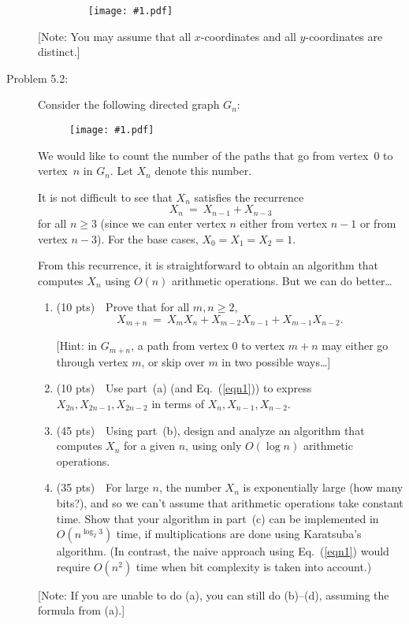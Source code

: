 \documentclass[11pt]{article}
\newcommand{\fig}[2]{\begin{figure}[h]\begin{center}%
  \texttt{[image: \#1.pdf]}\end{center}%
  \end{figure}}
\begin{document}
\begin{description}
\begin{enumerate}
\fig{hw5fig}{0.5,page=3}
\end{enumerate}

[Note: You may assume that all $x$-coordinates and all $y$-coordinates are distinct.]


\bigskip
\item[Problem 5.2:]
Consider the following directed graph $G_n$:

\fig{hw5fig2}{0.7}

We would like to count the number of the paths that go from vertex~$0$ to vertex~$n$ in $G_n$.  Let $X_n$ denote this number.

It is not difficult to see that $X_n$ satisfies the
recurrence 
\begin{equation}\label{eqn1}
X_n\:=\: X_{n-1}+X_{n-3}
\end{equation}
for all $n\ge 3$ (since we can enter vertex $n$ either from vertex $n-1$ or from vertex $n-3$).  For the base cases, $X_0=X_1=X_2=1$.

From this recurrence, it is straightforward to obtain an algorithm that computes $X_n$ using $O(n)$ arithmetic operations.  But we can do better\ldots

\begin{enumerate}
\item[(a)] (10 pts)\ \
Prove that for all $m,n\ge 2$,
\[ X_{m+n} \:=\: X_m X_n + X_{m-2} X_{n-1} + X_{m-1} X_{n-2}. \]

[Hint: in $G_{m+n}$, a path from vertex 0 to vertex $m+n$ may either go through vertex $m$,
or skip over $m$ in two possible ways\ldots]

\item[(b)] (10 pts)\ \ 
Use part~(a) (and Eq.~(\ref{eqn1})) 
to express $X_{2n},X_{2n-1},X_{2n-2}$ in terms of
$X_n,X_{n-1},X_{n-2}$.

\item[(c)] (45 pts)\ \
Using part~(b), design and analyze 
an algorithm that computes $X_n$ for a given $n$, using only $O(\log n)$ 
arithmetic operations.

\item[(d)] (35 pts)\ \
For large $n$, the number $X_n$ is exponentially large (how many bits?), and so we can't assume that arithmetic operations take constant time.
Show that your algorithm in part~(c) can be implemented in $O(n^{\log_2 3})$ time, if multiplications are done using Karatsuba's algorithm.
(In contrast, the naive approach using Eq.~(\ref{eqn1}) would require
$O(n^2)$ time when bit complexity is taken into account.)
\end{enumerate}

[Note: If you are unable to do (a), you can still do (b)--(d), assuming the formula from (a).]



\end{description}
\end{document}
